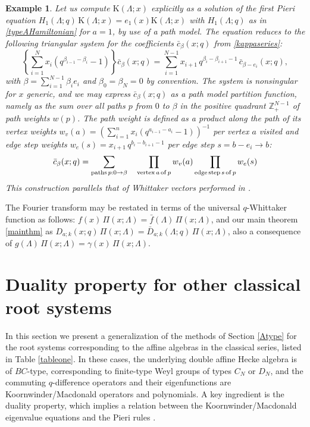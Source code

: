 \documentclass[12pt]{amsart}
\newtheorem{example}[thm]{Example}
\newcommand{\Z}{{\mathbb Z}}
\newcommand{\lL}{{\Lambda}}
\numberwithin{equation}{section}
\begin{document}
%
%
%
%
%


\begin{example}\label{pathAex}
Let us compute  $\mathrm{K}(\Lambda;x)$ explicitly as a solution of the first Pieri equation $H_1(\Lambda;q) \, \mathrm{K}(\Lambda;x)= e_1(x)\mathrm{K}(\Lambda;x)$ with $H_1(\lL;q)$ as in \eqref{typeAHamiltonian} for $a=1$,
by use of a path model. The equation reduces to the following triangular system for the coefficients $\bar{c}_\beta(x;q)$ from \eqref{kappaseries}:
$$\left\{\sum_{i=1}^N x_i (q^{\beta_{i-1}-\beta_i}-1)\right\}\bar{c}_\beta(x;q)=\sum_{i=1}^{N-1} x_{i+1} \,q^{\beta_i-\beta_{i+1}-1}\, \bar{c}_{\beta-e_i}(x;q),$$
with $\beta=\sum_{i=1}^{N-1} \beta_i e_i$ and $\beta_0=\beta_N=0$ by convention. 
The system is nonsingular for $x$ generic, and
we may express $\bar{c}_\beta(x;q)$ as a path model
partition function, namely as the sum over all paths $p$ from $0$ to $\beta$ in the positive quadrant $\Z_+^{N-1}$ of path weights $w(p)$. 
The path weight is defined as a product along the path of its vertex weights $w_v(a)=(\sum_{i=1}^n x_i (q^{a_{i-1}-a_i}-1))^{-1}$ per vertex $a$ visited and edge step weights $w_e(s)=x_{i+1} \,q^{b_i-b_{i+1}-1}$ per edge step $s=b-e_i\to b$:
$$\bar{c}_\beta(x;q)=\sum_{{\rm paths}\, p:0\to \beta} \quad \prod_{{\rm vertex}\, a\, {\rm of}\, p} w_v(a)\prod_{ {\rm edge}\, {\rm step}\, s\, {\rm of}\, p}
w_e(s)$$
This construction parallels that of Whittaker vectors performed in \cite{DKT}.
\end{example}


%

The Fourier transform may be restated in terms of the universal $q$-Whittaker function as follows:
$f(x)\, \Pi(x;\lL)={\bar f}(\lL)\, \Pi(x;\lL)$, and our main theorem \ref{mainthm} as $D_{a;k}(x;q)\, \Pi(x;\lL)=\bar D_{a;k}(\lL;q)\, \Pi(x;\lL)$, also a consequence
of $g(\lL) \, \Pi(x;\lL)=\gamma(x)\,  \Pi(x;\lL)$.



%


\section{Duality property for other classical root systems}\label{macdoG}


In this section we present a generalization of the methods of Section \ref{Atype} for the root systems corresponding to the affine algebras in the classical series, listed in Table \ref{tableone}. In these cases, the underlying double affine Hecke algebra is of $BC$-type, corresponding to finite-type Weyl groups of types $C_N$ or $D_N$, and the commuting $q$-difference operators and their eigenfunctions are Koornwinder/Macdonald operators and polynomials.
%
%
%
%
%
A key ingredient
%
%
is the duality property, which implies a relation between the Koornwinder/Macdonald eigenvalue equations and the Pieri rules  \cite{vDselfdual,Sahi,cheredMehta}.
%
%
%
%
\end{document}
